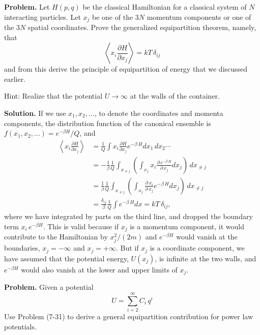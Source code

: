 \documentclass[twocolumn, 10pt]{article}
\numberwithin{equation}{section}
\newenvironment{problem}
{\par\medskip\sffamily \color{problue}
  \textbf{Problem. }\ignorespaces}
{\medskip}
\newenvironment{solution}
{\par\medskip
  \textbf{Solution. }\ignorespaces}
{\medskip}
\begin{document}
\begin{problem}
  Let $H(p, q)$ be the classical Hamiltonian
  for a classical system of $N$ interacting particles.
  Let $x_j$ be one of the $3N$ momentum components
  or one of the $3N$ spatial coordinates.
  Prove the generalized equipartition theorem, namely, that
  $$
  \left\langle
    x_i \frac{ \partial H } { \partial x_j }
  \right\rangle
  = kT \, \delta_{ij}
  $$
  and from this derive the principle
  of equipartition of energy that we discussed earlier.

  Hint: Realize that the potential $U \to \infty$
  at the walls of the container.
\end{problem}

\begin{solution}
If we use $x_1, x_2, \dots$, to denote
the coordinates and momenta components,
the distribution function of the canonical ensemble
is $f(x_1, x_2, \dots) = e^{-\beta H}/Q$, and
%
\begin{align*}
  \left\langle
    x_i \frac{ \partial H } { \partial x_j }
  \right\rangle
  &=
  \frac{1}{Q} \int
    x_i \frac{ \partial H } { \partial x_j }
    e^{-\beta \, H}
    d x_1 \, d x_2 \cdots
  \\
  &=
  -
  \frac{1}{\beta}
  \frac{1}{Q}
  \int_{x_{\ne j}}
    \left(
      \int_{x_j}
      x_i \frac{ \partial \, e^{-\beta \, H} } { \partial \, x_j }
      d x_j
    \right) \, d x_{\ne j}
  \\
  &=
  \frac{1}{\beta}
  \frac{1}{Q}
  \int_{x_{\ne j}}
    \left(
      \int_{x_j}
      \frac{ \partial \, x_i } { \partial \, x_j }
      e^{-\beta \, H}
      d x_j
    \right)
  \, d x_{\ne j}
  \\
  &=
  \frac{\delta_{ij}}{\beta}
  \frac{1}{Q}
  \int e^{-\beta \, H} d x
  = kT \, \delta_{ij}
  ,
\end{align*}
%
where we have integrated by parts on the third line,
and dropped the boundary term $x_i \, e^{-\beta H}$.
This is valid because if $x_j$ is a momentum component,
it would contribute to the Hamiltonian by $x_j^2/(2m)$
and $e^{-\beta H}$ would vanish at the boundaries,
$x_j = -\infty$ and $x_j = +\infty$.
%
But if $x_j$ is a coordinate component,
we have assumed that the potential energy, $U(x_j)$,
is infinite at the two walls,
and $e^{-\beta H}$ would also vanish
at the lower and upper limits of $x_j$.
\end{solution}

\begin{problem}
  Given a potential
  $$
  U = \sum_{i=2}^\infty C_i \, q^i
  $$
  Use Problem (7-31) to derive a general
  equipartition contribution for power law potentials.
\end{problem}
\end{document}
